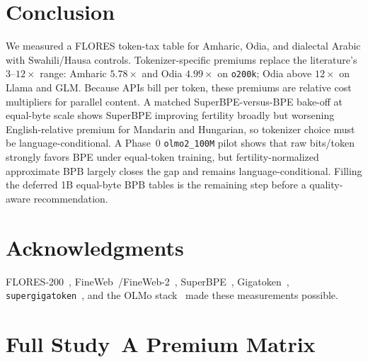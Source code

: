 \documentclass[11pt,a4paper]{article}
\begin{document}
\section{Conclusion}
\label{sec:conclusion}

We measured a FLORES token-tax table for Amharic, Odia, and dialectal Arabic with Swahili/Hausa controls.
Tokenizer-specific premiums replace the literature's $3$--$12\times$ range: Amharic $5.78\times$ and Odia $4.99\times$ on \texttt{o200k}; Odia above $12\times$ on Llama and GLM.
Because APIs bill per token, these premiums are relative cost multipliers for parallel content.
A matched SuperBPE-versus-BPE bake-off at equal-byte scale shows SuperBPE improving fertility broadly but worsening English-relative premium for Mandarin and Hungarian, so tokenizer choice must be language-conditional.
A Phase~0 \texttt{olmo2\_100M} pilot shows that raw bits/token strongly favors BPE under equal-token training, but fertility-normalized approximate BPB largely closes the gap and remains language-conditional.
Filling the deferred 1B equal-byte BPB tables is the remaining step before a quality-aware recommendation.

\section*{Acknowledgments}
FLORES-200~\citep{goyal2022flores,nllb2022}, FineWeb~/FineWeb-2~\citep{penedo2024fineweb,penedo2025fineweb2}, SuperBPE~\citep{liu2025superbpe}, Gigatoken~\citep{roed2026gigatoken}, \texttt{supergigatoken}~\citep{verma2026supergigatoken}, and the OLMo stack~\citep{olmo2025} made these measurements possible.




\appendix
\section{Full Study~A Premium Matrix}
\label{app:full-premium}
\end{document}
